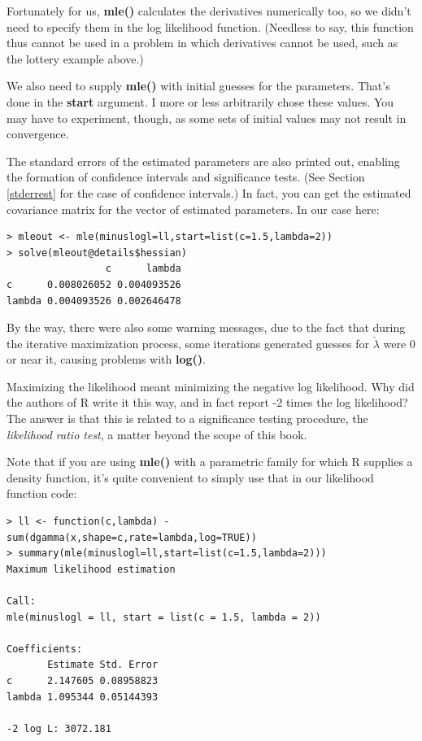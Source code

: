 Fortunately for us, {\bf mle()} calculates the derivatives numerically
too, so we didn't need to specify them in the log likelihood function.
(Needless to say, this function thus cannot be used in a problem in
which derivatives cannot be used, such as the lottery example above.)

We also need to supply {\bf mle()} with initial guesses for the
parameters.  That's done in the {\bf start} argument.  I more or less
arbitrarily chose these values.  You may have to experiment,
though, as some sets of initial values may not result in convergence.

The standard errors of the estimated parameters are also printed out,
enabling the formation of confidence intervals and significance tests.
(See Section \ref{stderrest} for the case of confidence intervals.)  In
fact, you can get the estimated covariance matrix for the vector of
estimated parameters.  In our case here:

\begin{Verbatim}[fontsize=\relsize{-2}]
> mleout <- mle(minuslogl=ll,start=list(c=1.5,lambda=2))
> solve(mleout@details$hessian)
                 c      lambda
c      0.008026052 0.004093526
lambda 0.004093526 0.002646478
\end{Verbatim}

By the way, there were also some warning messages, due to the fact that
during the iterative maximization process, some iterations generated
guesses for $\check{\lambda}$ were 0 or near it, causing problems with
{\bf log()}.

Maximizing the likelihood meant minimizing the negative log likelihood.
Why did the authors of R write it this way, and in fact report -2 times
the log likelihood?  The answer is that this is related to a
significance testing procedure, the {\it likelihood ratio test}, a
matter beyond the scope of this book.

Note that if you are using {\bf mle()} with a parametric family for
which R supplies a density function, it's quite convenient to simply use
that in our likelihood function code:

\begin{lstlisting}
> ll <- function(c,lambda) -sum(dgamma(x,shape=c,rate=lambda,log=TRUE))
> summary(mle(minuslogl=ll,start=list(c=1.5,lambda=2)))
Maximum likelihood estimation

Call:
mle(minuslogl = ll, start = list(c = 1.5, lambda = 2))

Coefficients:
       Estimate Std. Error
c      2.147605 0.08958823
lambda 1.095344 0.05144393

-2 log L: 3072.181 
\end{lstlisting}

